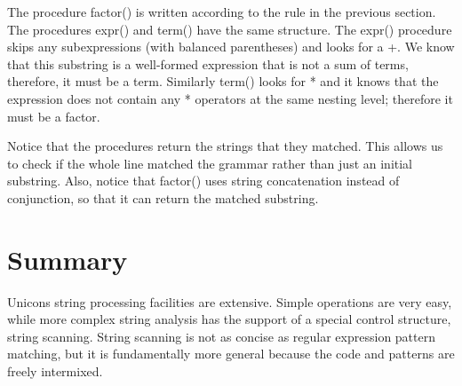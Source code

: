 The procedure \textsf{factor()} is written according to the rule in the
previous section. The procedures \textsf{expr()} and \textsf{term()}
have the same structure. The \textsf{expr()} procedure skips any
subexpressions (with balanced parentheses) and looks for a \textsf{+}.
We know that this substring is a well-formed expression that is not a
sum of terms, therefore, it must be a term. Similarly \textsf{term()}
looks for \textsf{*} and it knows that the expression does not contain
any \textsf{*} operators at the same nesting level; therefore it must
be a factor.

Notice that the procedures return the strings that they matched. This
allows us to check if the whole line matched the grammar rather than
just an initial substring. Also, notice that \textsf{factor()} uses
string concatenation instead of conjunction, so that it can return the
matched substring.

\section*{Summary}

Unicon{\textquotesingle}s string processing facilities are extensive.
Simple operations are very easy, while more complex string analysis has
the support of a special control structure, string scanning. String
scanning is not as concise as regular expression pattern matching, but
it is fundamentally more general because the code and patterns are
freely intermixed.

